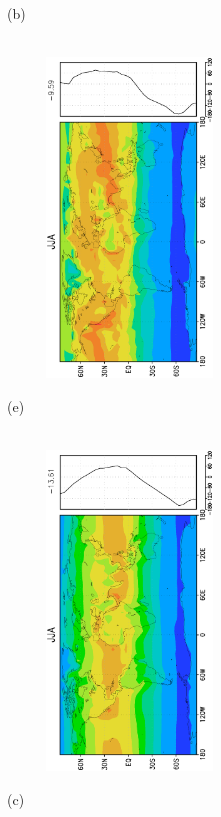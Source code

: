 \documentclass[12pt,a4paper,twoside,openright,headinclude,liststotoc,bibtotoc]{scrreprt}
\begin{document}
\begin{figure}[H]
{}
\parbox{8.5cm}{\hspace{0.50cm}\begin{scriptsize}(b)\end{scriptsize} \vspace{-0.7cm} \\
\includegraphics[height=8.5cm,width=6.5cm,angle=-90]
{eps/zonalysmnetradJJA.eps}
}
\parbox{8.5cm}{\hspace{0.50cm}\begin{scriptsize}(e)\end{scriptsize} \vspace{-0.7cm} \\
\includegraphics[height=8.5cm,width=6.5cm,angle=-90]
{eps/zonalfinalt21ysmnetradJJA.eps}
}
\parbox{8.5cm}{\hspace{0.50cm}\begin{scriptsize}(c)\end{scriptsize} \vspace{-0.7cm} \\
}
\end{figure}
\end{document}
